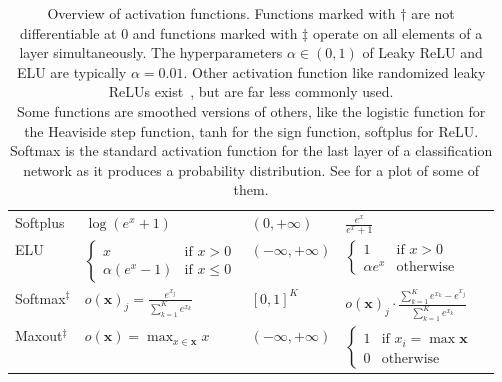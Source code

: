 \begin{table}[H]
\begin{tabular}{lllll}
    Softplus                 & $\log(e^x + 1)$                                & $(0, +\infty)$                                       & $\frac{e^x}{e^x + 1}$    & \cite{dugas2001incorporating,glorot2011deep} \\
    \gls{ELU}                & $\begin{cases}x &\text{if } x > 0\\\alpha (e^x - 1) &\text{if } x \leq 0\end{cases}$ & $(-\infty, +\infty)$ & $\begin{cases}1 &\text{if } x > 0\\\alpha e^x &\text{otherwise}\end{cases}$ & \cite{clevert2015fast} \\
    Softmax$^\ddagger$       & $o(\mathbf{x})_j = \frac{e^{x_j}}{\sum_{k=1}^K e^{x_k}}$    & $[0, 1]^K$                                           & $o(\mathbf{x})_j \cdot \frac{\sum_{k=1}^K e^{x_k} - e^{x_j}}{\sum_{k=1}^K e^{x_k}}$         & \cite{AlexNet-2012,Thoma:2014}\\
    Maxout$^\ddagger$        & $o(\mathbf{x}) = \max_{x \in \mathbf{x}} x$                 & $(-\infty, +\infty)$                                 & $\begin{cases}1 &\text{if } x_i = \max \mathbf{x}\\0 &\text{otherwise}\end{cases}$          & \cite{goodfellow2013maxout}       \\
    \bottomrule
    \end{tabular}
    \caption[Activation functions]{Overview of activation functions. Functions
             marked with $\dagger$ are not differentiable at 0 and functions
             marked with $\ddagger$ operate on all elements of a layer
             simultaneously. The hyperparameters $\alpha \in (0, 1)$ of Leaky
             ReLU and ELU are typically $\alpha = 0.01$. Other activation
             function like randomized leaky ReLUs exist~\cite{xu2015empirical},
             but are far less commonly used.\\
             Some functions are smoothed versions of others, like the logistic
             function for the Heaviside step function, tanh for the sign
             function, softplus for ReLU.\\
             Softmax is the standard activation function for the last layer of
             a classification network as it produces a probability
             distribution. See  for a plot
             of some of them.}
    \label{table:activation-functions-overview}
\end{table}

